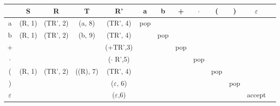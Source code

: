 
\begin{table}[H]
    \centering
    \begin{tabular}{|c|c|c|c|c|c|c|c|c|c|c|c|c|}
        \hline & S & R & T & R' & a & b & + & $\cdot$ & ( & ) & $\varepsilon$\\
        \hline a & (R, 1)  & (TR', 2)  & (a, 8) & (TR', 4)  & pop &  &  &  & & &\\
        \hline b & (R, 1)  & (TR', 2)  & (b, 9) & (TR', 4)  &  & pop &  &  & & &\\
        \hline + &  &  &  & (+TR',3) &  &  & pop &  & & &\\
        \hline $\cdot$ &  &  &  & ($\cdot$ R',5) &  &  &  & pop & & &\\
        \hline ( & (R, 1)  & (TR', 2)  & ((R), 7) & (TR', 4)  &  &  &  &  & pop & &\\
        \hline ) &  &  &  & ($\varepsilon$, 6) &  &  &  &  & & pop &\\
        \hline $\varepsilon$ &  &  &  & ($\varepsilon$,6) &  &  &  &  & & & accept \\
        \hline
    \end{tabular}
    \label{tab:my_label}
\end{table}